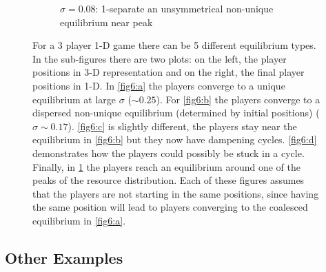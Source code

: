 \documentclass{article}
\begin{document}
\begin{figure}[ht!]
                \begin{subfigure}[b]{.47\linewidth}
                     
                    \caption{$\sigma=0.08$: 1-separate an unsymmetrical non-unique equilibrium near peak} 
                    \label{fig6:e} 
                \end{subfigure} 
           
                \caption{For a 3 player 1-D game there can be 5 different equilibrium types. In the sub-figures there are two plots: on the left, the player positions in 3-D representation and on the right, the final player positions in 1-D. In \cref{fig6:a} the players converge to a unique equilibrium at large $\sigma$ ($\sim 0.25$). For \cref{fig6:b} the players converge to a dispersed non-unique equilibrium (determined by initial positions) ($\sigma \sim 0.17$). \cref{fig6:c} is slightly different, the players stay near the equilibrium in \cref{fig6:b} but they now have dampening cycles. \cref{fig6:d} demonstrates how the players could possibly be stuck in a cycle. Finally, in \cref{fig6:e} the players reach an equilibrium around one of the peaks of the resource distribution. Each of these figures assumes that the players are not starting in the same positions, since having the same position will lead to players converging to the coalesced equilibrium in \cref{fig6:a}.}
                \label{fig6} 
            \end{figure}
                

        \clearpage

            
        \subsection{Other Examples}
\end{document}
